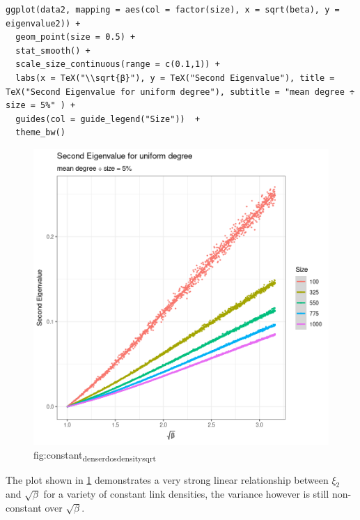 \documentclass[11pt]{article}
\begin{document}
\begin{listing}[htbp]
\begin{verbatim}
ggplot(data2, mapping = aes(col = factor(size), x = sqrt(beta), y = eigenvalue2)) +
  geom_point(size = 0.5) +
  stat_smooth() +
  scale_size_continuous(range = c(0.1,1)) +
  labs(x = TeX("\\sqrt{β}"), y = TeX("Second Eigenvalue"), title = TeX("Second Eigenvalue for uniform degree"), subtitle = "mean degree ÷ size = 5%" ) +
  guides(col = guide_legend("Size"))  +
  theme_bw()
\end{verbatim}
\caption{\label{l:constant_dens_erdos_density_sqrt}listing:constant\textsubscript{size}\textsubscript{erdos}\textsubscript{density}\textsubscript{sqrt}}
\end{listing}



\begin{figure}[htbp]
\centering
\includegraphics[width=12cm]{media/constant_dens_erdos_density_sqrt.png}
\caption{\label{fig:constant_dens_erdos_density_sqrt}fig:constant\textsubscript{dens}\textsubscript{erdos}\textsubscript{density}\textsubscript{sqrt}}
\end{figure}


The plot shown in \ref{fig:constant_dens_erdos_density_sqrt}  demonstrates a very strong linear relationship between \(\xi_{2}\) and \(\sqrt{\beta}\) for a variety of constant link densities, the variance however is still non-constant over \(\sqrt{\beta}\).
\end{document}
